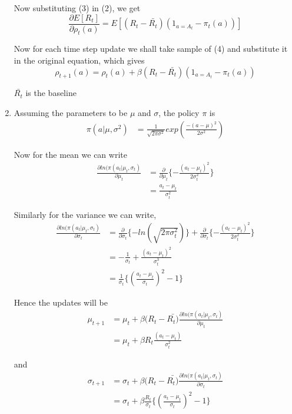 \documentclass[a4paper,english]{article}
\begin{document}
\begin{enumerate}
Now substituting (3) in (2), we get
\begin{equation}
\frac{\partial E[R_{t}]}{\partial\rho_{t}(a)}=E[(R_{t}-\bar{R_{t}})(1_{a=A_{t}}-\pi_{t}(a))]\label{eq-1}
\end{equation}

Now for each time step update we shall take sample of (4) and substitute
it in the original equation, which gives
\[
\rho_{t+1}(a)=\rho_{t}(a)+\beta(R_{t}-\bar{R_{t}})(1_{a=A_{t}}-\pi_{t}(a))
\]

$\bar{R_{t}}$ is the baseline
\item Assuming the parameters to be $\mu$ and $\sigma$, the policy $\pi$
is
\begin{align}
\pi(a|\mu,\sigma^{2}) & =\frac{1}{\sqrt{2\pi\sigma^{2}}}exp(\frac{-(a-\mu)^{2}}{2\sigma^{2}})\label{Sampled from the normal distribution}
\end{align}

Now for the mean we can write
\begin{align*}
\frac{\partial ln(\pi(a_{t}|\mu_{t},\sigma_{t})}{\partial\mu_{t}} & =\frac{\partial}{\partial\mu_{t}}\{-\frac{(a_{t}-\mu_{t})^{2}}{2\sigma_{t}^{2}}\}\\
 & =\frac{a_{t}-\mu_{t}}{\sigma_{t}^{2}}
\end{align*}

Similarly for the variance we can write,
\begin{align*}
\frac{\partial ln(\pi(a_{t}|\mu_{t},\sigma_{t})}{\partial\sigma_{t}} & =\frac{\partial}{\partial\sigma_{t}}\{-ln(\sqrt{2\pi\sigma_{t}^{2}})\}+\frac{\partial}{\partial\sigma_{t}}\{-\frac{(a_{t}-\mu_{t})^{2}}{2\sigma_{t}^{2}}\}\\
 & =-\frac{1}{\sigma_{t}}+\frac{(a_{t}-\mu_{t})^{2}}{\sigma_{t}^{3}}\\
 & =\frac{1}{\sigma_{t}}\{(\frac{a_{t}-\mu_{t}}{\sigma_{t}})^{2}-1\}
\end{align*}

Hence the updates will be
\begin{align}
\mu_{t+1} & =\mu_{t}+\beta(R_{t}-\bar{R_{t})}\frac{\partial ln(\pi(a_{t}|\mu_{t},\sigma_{t})}{\partial\mu_{t}}\nonumber \\
 & =\mu_{t}+\beta R_{t}\frac{(a_{t}-\mu_{t})}{\sigma_{t}^{2}}\label{baseline is 0}
\end{align}

and
\begin{align*}
\sigma_{t+1} & =\sigma_{t}+\beta(R_{t}-\bar{R_{t})}\frac{\partial ln(\pi(a_{t}|\mu_{t},\sigma_{t})}{\partial\sigma_{t}}\\
 & =\sigma_{t}+\beta\frac{R_{t}}{\sigma_{t}}\{(\frac{a_{t}-\mu_{t}}{\sigma_{t}})^{2}-1\}
\end{align*}
\end{enumerate}
\end{document}
